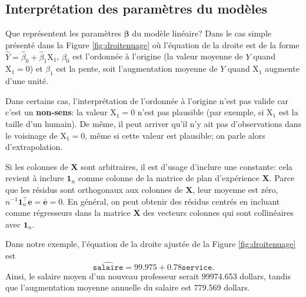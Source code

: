 \documentclass[
  11pt,
  letterpaper,
]{article}
\theoremstyle{definition}
\theoremstyle{definition}
\theoremstyle{definition}
\theoremstyle{definition}
\theoremstyle{remark}
\begin{document}
\hypertarget{interpruxe9tation-des-paramuxe8tres-du-moduxe8les}{%
\subsection{Interprétation des paramètres du modèles}\label{interpruxe9tation-des-paramuxe8tres-du-moduxe8les}}

Que représentent les paramètres \(\boldsymbol{\beta}\) du modèle linéaire? Dans le cas simple présenté dans la Figure \ref{fig:droitenuage} où l'équation de la droite est de la forme \(\widehat{Y} = \widehat{\beta}_0 + \widehat{\beta}_1\mathrm{X}_1\), \(\beta_0\) est l'ordonnée à l'origine (la valeur moyenne de \(Y\) quand \(\mathrm{X}_1=0\)) et \(\beta_1\) est la pente, soit l'augmentation moyenne de \(Y\) quand \(\mathrm{X}_1\) augmente d'une unité.

Dans certains cas, l'interprétation de l'ordonnée à l'origine n'est pas valide car c'est un \textbf{non-sens}: la valeur \(\mathrm{X}_1=0\) n'est pas plausible (par exemple, si \(\mathrm{X}_1\) est la taille d'un humain). De même, il peut arriver qu'il n'y ait pas d'observations dans le voisinage de \(\mathrm{X}_1=0\), même si cette valeur est plausible; on parle alors d'extrapolation.

Si les colonnes de \(\mathbf{X}\) sont arbitraires, il est d'usage d'inclure une constante: cela revient à inclure \(\mathbf{1}_n\) comme colonne de la matrice de plan d'expérience \(\mathbf{X}\). Parce que les résidus sont orthogonaux aux colonnes de \(\mathbf{X}\), leur moyenne est zéro, \(n^{-1}\mathbf{1}_n^\top\boldsymbol{e}=\bar{\boldsymbol{e}}=0\). En général, on peut obtenir des résidus centrés en incluant comme régresseurs dans la matrice \(\mathbf{X}\) des vecteurs colonnes qui sont collinéaires avec \(\mathbf{1}_n\).

Dans notre exemple, l'équation de la droite ajustée de la Figure \ref{fig:droitenuage} est \[\widehat{\texttt{salaire}} = 99.975 + 0.78\texttt{service}.\]
Ainsi, le salaire moyen d'un nouveau professeur serait 99974.653 dollars, tandis que l'augmentation moyenne annuelle du salaire est 779.569 dollars.
\end{document}
